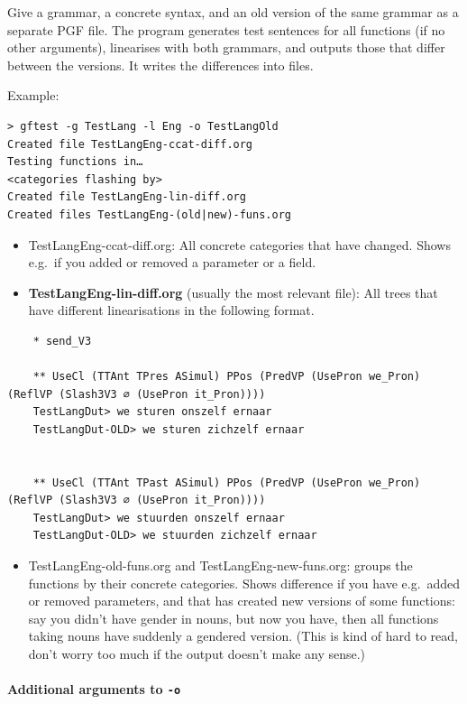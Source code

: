 Give a grammar, a concrete syntax, and an old version of the same
grammar as a separate PGF file. The program generates test sentences for
all functions (if no other arguments), linearises with both grammars,
and outputs those that differ between the versions. It writes the
differences into files.

Example:

\begin{verbatim}
> gftest -g TestLang -l Eng -o TestLangOld
Created file TestLangEng-ccat-diff.org
Testing functions in…
<categories flashing by>
Created file TestLangEng-lin-diff.org
Created files TestLangEng-(old|new)-funs.org
\end{verbatim}

\begin{itemize}
\item
  TestLangEng-ccat-diff.org: All concrete categories that have changed.
  Shows e.g.~if you added or removed a parameter or a field.
\item
  \textbf{TestLangEng-lin-diff.org} (usually the most relevant file):
  All trees that have different linearisations in the following format.
\end{itemize}

\begin{verbatim}
    * send_V3

    ** UseCl (TTAnt TPres ASimul) PPos (PredVP (UsePron we_Pron) (ReflVP (Slash3V3 ∅ (UsePron it_Pron))))
    TestLangDut> we sturen onszelf ernaar
    TestLangDut-OLD> we sturen zichzelf ernaar


    ** UseCl (TTAnt TPast ASimul) PPos (PredVP (UsePron we_Pron) (ReflVP (Slash3V3 ∅ (UsePron it_Pron))))
    TestLangDut> we stuurden onszelf ernaar
    TestLangDut-OLD> we stuurden zichzelf ernaar
\end{verbatim}

\begin{itemize}
\tightlist
\item
  TestLangEng-old-funs.org and TestLangEng-new-funs.org: groups the
  functions by their concrete categories. Shows difference if you have
  e.g.~added or removed parameters, and that has created new versions of
  some functions: say you didn't have gender in nouns, but now you have,
  then all functions taking nouns have suddenly a gendered version.
  (This is kind of hard to read, don't worry too much if the output
  doesn't make any sense.)
\end{itemize}

\hypertarget{additional-arguments-to--o}{%
\paragraph{\texorpdfstring{Additional arguments to
\texttt{-o}}{Additional arguments to -o}}\label{additional-arguments-to--o}}


